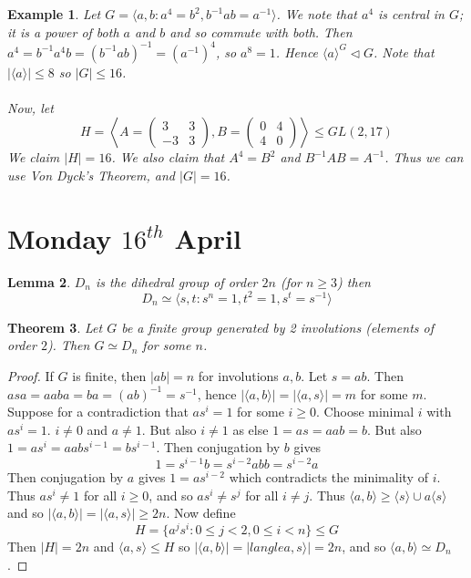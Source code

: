 \documentclass[a4paper,10pt]{article}
\newtheorem{thm}{Theorem}
\newtheorem{eg}[thm]{Example}
\newtheorem{Lem}[thm]{Lemma}
\begin{document}
\begin{eg}
Let $G = \langle a,b : a^4 = b^2, b^{-1} a b = a^{-1} \rangle$. We note that $a^4$ is central in $G$; it is a power of both $a$ and $b$ and so commute with both. Then $a^4 = b^{-1} a^4 b = (b^{-1} a b)^{-1} = (a^{-1})^4$, so $a^8 = 1$. Hence $\langle a \rangle^G \triangleleft G$. Note that $|\langle a \rangle| \leq 8$ so $|G| \leq 16$. \\
\\
Now, let 
\[ H = \left\langle A = \begin{pmatrix} 3 & 3 \\ -3 & 3 \end{pmatrix}, B = \begin{pmatrix} 0 & 4 \\ 4 & 0 \end{pmatrix} \right\rangle \leq GL(2,17) \]
We claim $|H| = 16$. We also claim that $A^4 = B^2$ and $B^{-1} A B = A^{-1}$. Thus we can use Von Dyck's Theorem, and $|G| = 16$. 
\end{eg}


\newpage
\section{Monday $16^{th}$ April}

\begin{Lem}
$D_n$ is the dihedral group of order $2n$ (for $n \geq 3$) then
\[ D_n \simeq \langle s,t : s^n = 1, t^2 = 1, s^t = s^{-1} \rangle \]

\end{Lem}

\begin{thm}
Let $G$ be a finite group generated by 2 involutions (elements of order $2$). Then $G \simeq D_n$ for some $n$. 
\end{thm}

\begin{proof}
If $G$ is finite, then $|ab| = n$ for involutions $a,b$. Let $s = ab$. Then $asa = aaba = ba = (ab)^{-1} = s^{-1}$, hence $|\langle a,b \rangle| = |\langle a,s \rangle| = m $ for some $m$. Suppose for a contradiction that $as^i = 1$ for some $i \geq 0$. Choose minimal $i$ with $as^i = 1$. $i \neq 0$ and $a \neq 1$. But also $i \neq 1$ as else $1 = as = aab = b$. But also $1 = as^i = aabs^{i-1} = bs^{i-1}$. Then conjugation by $b$ gives
\[ 1 = s^{i-1}b = s^{i-2} a bb = s^{i-2} a \]
Then conjugation by $a$ gives $1  = as^{i-2}$ which contradicts the minimality of $i$. Thus $as^i \neq 1$ for all $i \geq 0$, and so $as^i \neq s^j$ for all $i \neq j$. Thus $\langle a,b \rangle  \geq \langle s \rangle \cup a \langle s \rangle$ and so $|\langle a,b \rangle | = |\langle a,s\rangle | \geq 2n$. Now define 
\[ H = \{ a^j s^i : 0 \leq j < 2, 0 \leq i < n \} \leq G \]
Then $|H| = 2n$ and $\langle a, s \rangle \leq H$ so $|\langle a,b \rangle| = |langle a,s\rangle| = 2n$, and so $\langle a,b \rangle \simeq D_n$. 
\end{proof}
\end{document}
